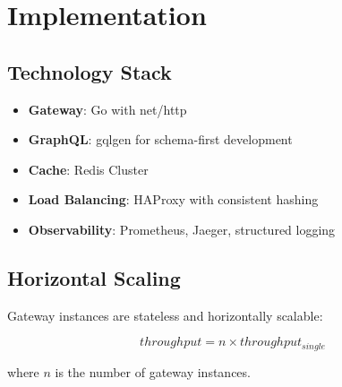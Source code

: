 \section{Implementation}


\subsection{Technology Stack}

\begin{itemize}
    \item \textbf{Gateway}: Go with net/http
    \item \textbf{GraphQL}: gqlgen for schema-first development
    \item \textbf{Cache}: Redis Cluster
    \item \textbf{Load Balancing}: HAProxy with consistent hashing
    \item \textbf{Observability}: Prometheus, Jaeger, structured logging
\end{itemize}

\subsection{Horizontal Scaling}

Gateway instances are stateless and horizontally scalable:

\begin{equation}
throughput = n \times throughput_{single}
\end{equation}

where $n$ is the number of gateway instances.

